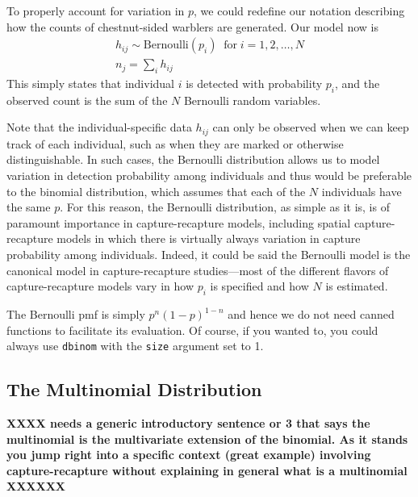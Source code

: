 
To properly account for variation in $p$, we could redefine our notation
describing how the counts of chestnut-sided warblers are
generated. Our model now is
\begin{gather}
h_{ij} \sim \text{Bernoulli}(p_i) \;\; \text{for} \; i=1,2,\dots,N \\
n_j = \sum_i h_{ij}
\label{modeling.eq.Bern}
\end{gather}
This simply states that individual $i$ is detected with probability
$p_i$, and the observed count is the sum of the $N$ Bernoulli random
variables.

Note that the individual-specific data $h_{ij}$ can only be
observed when we can keep track of each individual, such as when they
are marked or otherwise distinguishable.
In such cases, the Bernoulli distribution allows us to
model variation in detection probability among individuals and thus
would be preferable to the binomial distribution, which assumes that each
of the $N$ individuals have the same $p$.
For this reason, the Bernoulli
distribution, as simple as it is, is of paramount importance in
capture-recapture models, including spatial capture-recapture models
in which there is virtually always variation in capture probability
among individuals. Indeed, it could be said the Bernoulli model is the
canonical model in capture-recapture studies---most of the
different flavors of capture-recapture models vary in how $p_i$ is
specified and how $N$ is estimated.

The Bernoulli pmf is simply $p^n(1-p)^{1-n}$ and hence we do not need canned
functions to facilitate its evaluation. Of course, if you wanted to, you
could always use \verb+dbinom+ with the \verb+size+ argument set to
1.

\subsection{The Multinomial Distribution}

{\bf  XXXX needs a generic introductory sentence or 3 that says the
  multinomial is the multivariate extension of the binomial. As it
  stands you jump right into a specific context (great example)
  involving capture-recapture without explaining in general what is a
  multinomial XXXXXX}

